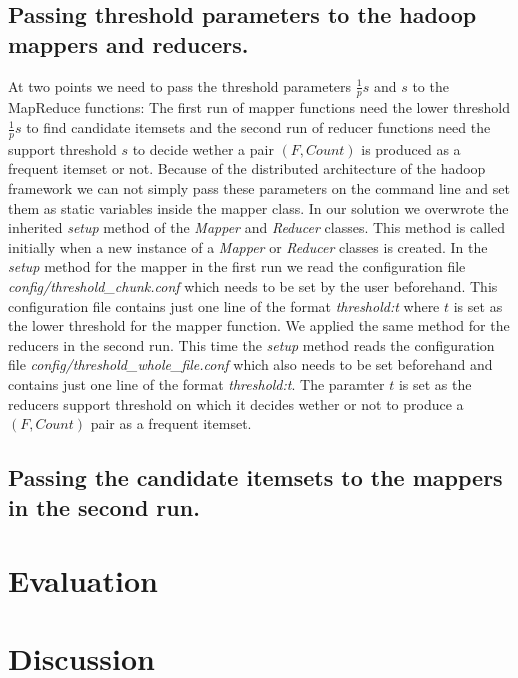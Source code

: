 \documentclass[a4paper,ngerman]{scrartcl}
\begin{document}
\subsection{Passing threshold parameters to the hadoop mappers and reducers.}
At two points we need to pass the threshold parameters $\frac{1}{p}s$ and $s$ to the MapReduce functions: The first run of mapper functions need the lower threshold $\frac{1}{p}s$ to find candidate itemsets and the second run of reducer functions need the support threshold $s$ to decide wether a pair $(F,Count)$ is produced as a frequent itemset or not. Because of the distributed architecture of the hadoop framework we can not simply pass these parameters on the command line and set them as static variables inside the mapper class. In our solution we overwrote the inherited \textit{setup} method of the \textit{Mapper} and \textit{Reducer} classes. This method is called initially when a new instance of a \textit{Mapper} or \textit{Reducer} classes is created. In the \textit{setup} method for the mapper in the first  run we read the configuration file \textit{config/threshold\_chunk.conf} which needs to be set by the user beforehand. This configuration file contains just one line of the format \textit{threshold:t} where $t$ is set as the lower threshold for the mapper function. We applied the same method for the reducers in the second run. This time the \textit{setup} method reads the configuration file \textit{config/threshold\_whole\_file.conf} which also needs to be set beforehand and contains just one line of the format \textit{threshold:t}. The paramter $t$ is set as the reducers support threshold on which it decides wether or not to produce a $(F,Count)$ pair as a frequent itemset.
\subsection{Passing the candidate itemsets to the mappers in the second run.}
 
\section{Evaluation}
\section{Discussion}
\end{document}

